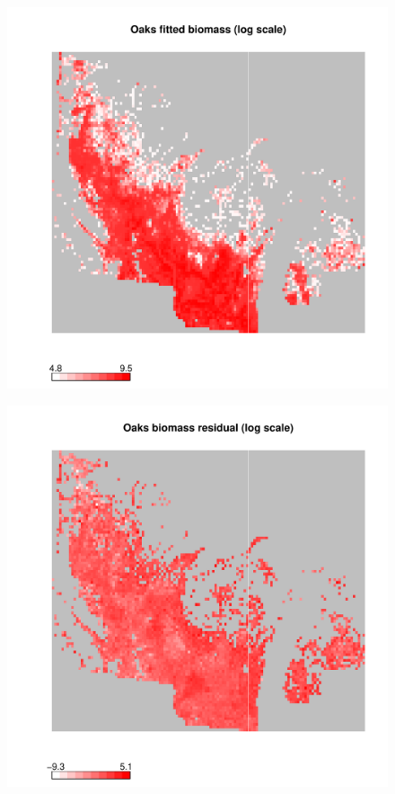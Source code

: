 \documentclass[authoryear, review, 11pt]{elsarticle}
\begin{document}
\begin{figure}
	\begin{center}
	\includegraphics[width=5in]{../../figures/Oaks-biomass-fitted.pdf}
	\caption{\label{fig:oaks-biomass-fitted}}
	\end{center}
\end{figure}

\begin{figure}
	\begin{center}
	\includegraphics[width=5in]{../../figures/Oaks-biomass-residual.pdf}
	\caption{\label{fig:oaks-biomass-residual}}
	\end{center}
\end{figure}
\end{document}
